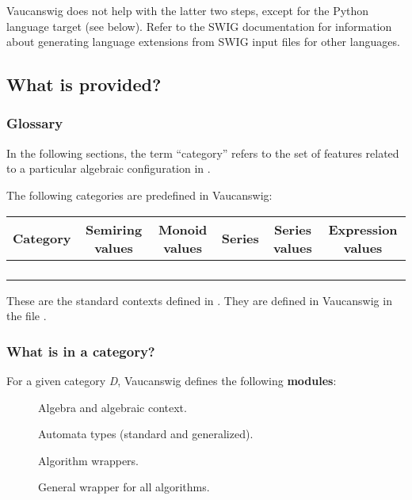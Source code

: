 Vaucanswig does not help with the latter two steps, except for the
Python language target (see below). Refer to the SWIG documentation
for information about generating language extensions from SWIG input
files for other languages.

\subsection{What is provided?}

\subsubsection{Glossary}

In the following sections, the term ``category'' refers to the set of
features related to a particular algebraic configuration in \Vauc.

The following categories are predefined in Vaucanswig:

\begin{center}
\begin{tabular}{*{6}{|c}|}
\hline
Category             & Semiring values & Monoid values  & Series          &Series values  & Expression values\\
\hline
{}         &      &   & \SerSAnMon{\B}{\Ae} & &   \\
     &       &   & \SerSAnMon{\Z}{\Ae} & &   \\
 &       &   & \SerSAnMon{\Z(\min,+)}{\Ae}& &   \\
 &       &   & \SerSAnMon{\Z(\max,+)}{\Ae}& &   \\
\hline
\end{tabular}
\end{center}

These are the standard contexts defined in \Vauc. They are defined
in Vaucanswig in the file .

\subsubsection{What is in a category?}

For   a  given   category  \emph{D},   Vaucanswig  defines   the  following
\textbf{modules}:

\begin{description}
\item[] Algebra and algebraic context.
\item[] Automata types (standard and
  generalized).
\item[]  Algorithm wrappers.
\item[] General wrapper for all
  algorithms.
\end{description}

